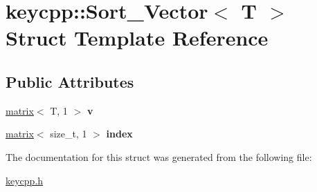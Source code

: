 \hypertarget{structkeycpp_1_1_sort___vector}{\section{keycpp\-:\-:Sort\-\_\-\-Vector$<$ T $>$ Struct Template Reference}
\label{structkeycpp_1_1_sort___vector}
}
\subsection*{Public Attributes}
\begin{DoxyCompactItemize}
\item 
\hypertarget{structkeycpp_1_1_sort___vector_aa28cca2efecf201607677f47e7801885}{\hyperlink{classkeycpp_1_1matrix}{matrix}$<$ T, 1 $>$ {\bfseries v}}\label{structkeycpp_1_1_sort___vector_aa28cca2efecf201607677f47e7801885}

\item 
\hypertarget{structkeycpp_1_1_sort___vector_afbe1a3dfe57ebf519ba3a15ffc6bdf4c}{\hyperlink{classkeycpp_1_1matrix}{matrix}$<$ size\-\_\-t, 1 $>$ {\bfseries index}}\label{structkeycpp_1_1_sort___vector_afbe1a3dfe57ebf519ba3a15ffc6bdf4c}

\end{DoxyCompactItemize}


The documentation for this struct was generated from the following file\-:\begin{DoxyCompactItemize}
\item 
\hyperlink{keycpp_8h}{keycpp.\-h}\end{DoxyCompactItemize}
